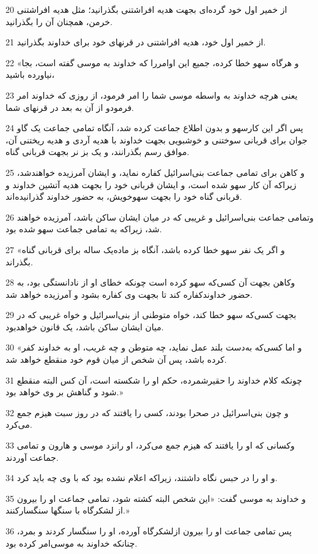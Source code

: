 \par 20 از خمیر اول خود گرده‌ای بجهت هدیه افراشتنی بگذرانید؛ مثل هدیه افراشتنی خرمن، همچنان آن را بگذرانید.
\par 21 از خمیر اول خود، هدیه افراشتنی در قرنهای خود برای خداوند بگذرانید.
\par 22 «و هرگاه سهو خطا کرده، جمیع این اوامررا که خداوند به موسی گفته است، بجا نیاورده باشید،
\par 23 یعنی هرچه خداوند به واسطه موسی شما را امر فرمود، از روزی که خداوند امر فرمودو از آن به بعد در قرنهای شما. 
\par 24 پس اگر این کارسهو و بدون اطلاع جماعت کرده شد، آنگاه تمامی جماعت یک گاو جوان برای قربانی سوختنی و خوشبویی بجهت خداوند با هدیه آردی و هدیه ریختنی آن، موافق رسم بگذرانند، و یک بز نر بجهت قربانی گناه.
\par 25 و کاهن برای تمامی جماعت بنی‌اسرائیل کفاره نماید، و ایشان آمرزیده خواهندشد، زیراکه آن کار سهو شده است، و ایشان قربانی خود را بجهت هدیه آتشین خداوند و قربانی گناه خود را بجهت سهوخویش، به حضور خداوند گذرانیده‌اند.
\par 26 وتمامی جماعت بنی‌اسرائیل و غریبی که در میان ایشان ساکن باشد، آمرزیده خواهند شد، زیراکه به تمامی جماعت سهو شده بود.
\par 27 «و اگر یک نفر سهو خطا کرده باشد، آنگاه بز ماده‌یک ساله برای قربانی گناه بگذراند.
\par 28 وکاهن بجهت آن کسی‌که سهو کرده است چونکه خطای او از نادانستگی بود، به حضور خداوندکفاره کند تا بجهت وی کفاره بشود و آمرزیده خواهد شد.
\par 29 بجهت کسی‌که سهو خطا کند، خواه متوطنی از بنی‌اسرائیل و خواه غریبی که در میان ایشان ساکن باشد، یک قانون خواهدبود.
\par 30 «و اما کسی‌که به‌دست بلند عمل نماید، چه متوطن و چه غریب، او به خداوند کفر کرده باشد، پس آن شخص از میان قوم خود منقطع خواهد شد.
\par 31 چونکه کلام خداوند را حقیرشمرده، حکم او را شکسته است، آن کس البته منقطع شود و گناهش بر وی خواهد بود.»
\par 32 و چون بنی‌اسرائیل در صحرا بودند، کسی را یافتند که در روز سبت هیزم جمع می‌کرد.
\par 33 وکسانی که او را یافتند که هیزم جمع می‌کرد، او رانزد موسی و هارون و تمامی جماعت آوردند.
\par 34 و او را در حبس نگاه داشتند، زیراکه اعلام نشده بود که با وی چه باید کرد.
\par 35 و خداوند به موسی گفت: «این شخص البته کشته شود، تمامی جماعت او را بیرون از لشکرگاه با سنگها سنگسارکنند.»
\par 36 پس تمامی جماعت او را بیرون ازلشکرگاه آورده، او را سنگسار کردند و بمرد، چنانکه خداوند به موسی‌امر کرده بود.

